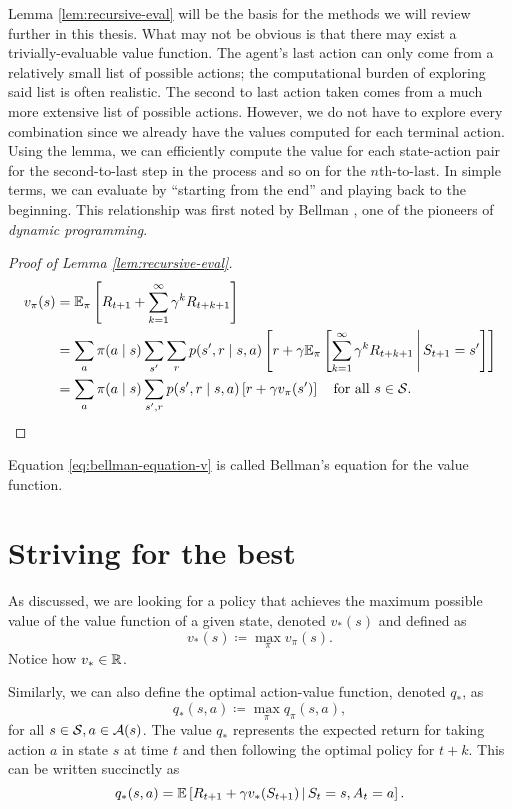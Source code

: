 Lemma \ref{lem:recursive-eval} will be the basis for the methods we will review
further in this thesis. What may not be obvious is that there may exist a
trivially-evaluable value function. The agent's last action can only come from a
relatively small list of possible actions; the computational burden of exploring
said list is often realistic. The second to last action taken comes from a much
more extensive list of possible actions. However, we do not have to explore
every combination since we already have the values computed for each terminal
action.  Using the lemma, we can efficiently compute the value for each
state-action pair for the second-to-last step in the process and so on for the
$n$th-to-last. In simple terms, we can evaluate by ``starting from the end'' and
playing back to the beginning. This relationship was first noted by Bellman
\cite{bellman1957}, one of the pioneers of \textit{dynamic programming}.

\begin{proof}[Proof of Lemma \ref{lem:recursive-eval}]
	\begin{align}
		\label{eq:bellman-equation-v}
		v_\pi (s) &= \mathbb{E}_{\pi} \left[ R_{t+1} + \sum_{k=1}^{\infty} \gamma^{k} R_{t+k+1} \right] \nonumber \\
		&= \sum_a \pi(a \mid s) \sum_{s'} \sum_r p(s', r \mid s, a) \left[ r + \gamma \mathbb{E}_\pi \left[ \sum_{k=1}^{\infty} \gamma^{k} R_{{t+k+1}} \,\middle\vert\, S_{t+1} = s' \right] \right] \nonumber \\
		&= \sum_a \pi(a \mid s) \sum_{s', r} p(s', r \mid s, a) \left[ r + \gamma v_{\pi} (s') \right] \quad \text{for all } s \in \mathcal{S}.
	\end{align}
\end{proof}

Equation \eqref{eq:bellman-equation-v} is called Bellman's equation for the
value function.

\section{Striving for the best}
As discussed, we are looking for a policy that achieves the maximum possible value
of the value function of a given state, denoted $v_*(s)$ and defined as
\[
	v_* (s) \coloneqq \max_{\pi} v_\pi (s).
\]
Notice how $v_* \in \mathbb{R}$.

Similarly, we can also define the optimal action-value function, denoted $q_*$, as
\[
	q_* (s, a) \coloneqq \max_{\pi} q_\pi (s, a),
\]
for all $s \in \mathcal{S}, a \in \mathcal{A}(s)$. The value $q_*$ represents the
expected return for taking action $a$ in state $s$ at time $t$ and then
following the optimal policy for $t+k$. This can be written succinctly as
\[
	q_{*} (s, a) = \mathbb{E} \left[ R_{t+1} + \gamma v_* (S_{t+1}) \,\middle\vert\, S_t = s, A_t = a \right].
\]


